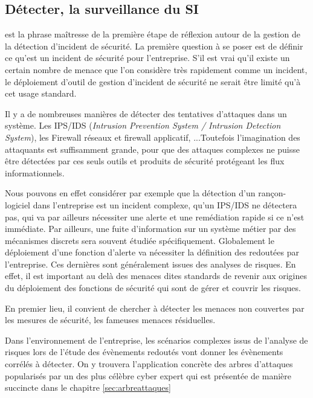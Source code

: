 \subsection{Détecter, la surveillance du SI}


 est la phrase maîtresse de la première étape de réflexion autour de la gestion de la détection d'incident de sécurité.
La première question à se poser est  de définir ce qu'est un incident de sécurité pour l'entreprise. S'il est vrai qu'il existe un certain nombre de menace  que l'on considère très rapidement comme un incident, le déploiement d'outil de gestion d'incident de sécurité ne serait être limité qu'à cet usage standard.

Il y a de nombreuses manières de détecter des tentatives d'attaques dans un système. Les IPS/IDS (\textit{Intrusion Prevention System / Intrusion Detection System}), les Firewall réseaux et firewall applicatif, ...Toutefois l'imagination des attaquants est suffisamment grande, pour que des attaques complexes ne puisse être détectées par ces seuls outils et produits de sécurité protégeant les flux informationnels.

Nous pouvons en effet considérer par exemple que la détection d'un rançon-logiciel dans l'entreprise est un incident complexe, qu'un IPS/IDS ne détectera pas,  qui va par ailleurs nécessiter une alerte et une remédiation rapide si ce n'est immédiate.
Par ailleurs,  une fuite d'information sur un système métier par des mécanismes discrets sera souvent étudiée spécifiquement.
Globalement le déploiement d'une fonction d'alerte va nécessiter la définition des  redoutées par l'entreprise. 
Ces dernières sont généralement issues des analyses de risques.
En effet, il est important au delà des menaces dites standards de revenir aux origines du déploiement des fonctions de sécurité qui sont de gérer et couvrir les risques.

En premier lieu, il convient de chercher à détecter les menaces non couvertes par les mesures de sécurité, les fameuses menaces résiduelles.

Dans l'environnement de l'entreprise, les scénarios complexes issus de l'analyse de risques lors de l'étude des évènements redoutés vont donner les évènements corrélés à détecter.
On y trouvera l'application concrète des arbres d'attaques popularisés par un des plus célèbre cyber expert   qui est présentée de manière succincte  dans le  chapitre \ref{sec:arbreattaques}

